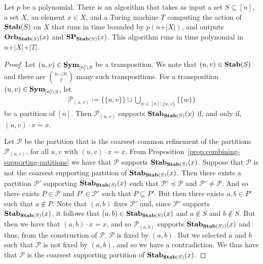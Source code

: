 \documentclass[../paper.tex]{subfiles}
\begin{document}
\begin{lem}
  \label{lem:computing-support-orbit}
  Let $p$ be a polynomial. There is an algorithm that takes as input a set $S
  \subseteq [n]$, a set $X$, an element $x \in X$, and a Turing machine $T$
  computing the action of $\text{\textbf{Stab}}(S)$ on $X$ that runs in time bounded by $p(n +
  \vert X \vert)$, and outputs $\text{\textbf{Orb}}_{\text{\textbf{Stab}}(S)} (x)$ and $\text{\textbf{SP}}_{\text{\textbf{Stab}}(S)}(x)$.
  This algorithm runs in time polynomial in $n + \vert X \vert + \vert T \vert$.
\end{lem}
\begin{proof}
  Let $(u, v) \in \text{\textbf{Sym}}_{[n] \setminus S}$ be a transposition. We note that
  $(u,v) \in \text{\textbf{Stab}}(S)$ and there are ${n - \vert S \vert}\choose{2}$ many such
  transpositions. For a transposition $(u, v) \in \text{\textbf{Sym}}_{[n] \setminus S}$, let
  \begin{align*}
    \mathcal{P}_{(u,v)} := \{ \{u,v\}\} \cup \bigcup_{w \in [n] \setminus \{ u,v \}} \{ \{ w \} \}
  \end{align*}
  be a partition of $[n]$. Then $\mathcal{P}_{(u,v)}$ supports
  $\text{\textbf{Stab}}_{\text{\textbf{Stab}}(S)}(x)$ if, and only if, $(u,v) \cdot x = x$.


  Let $\mathcal{P}$ be the partition that is the coarsest common refinement of
  the partitions $\mathcal{P}_{(u,v)}$, for all $u,v$ with $(u,v) \cdot x = x$.
  From Proposition~\ref{prop:combining-supporting-patitions} we have that
  $\mathcal{P}$ supports $\text{\textbf{Stab}}_{\text{\textbf{Stab}}(S)}(x)$. Suppose that $\mathcal{P}$ is
  not the coarsest supporting partition of $\text{\textbf{Stab}}_{\text{\textbf{Stab}}(S)}(x)$. Then there
  exists a partition $\mathcal{P}'$ supporting $\text{\textbf{Stab}}_{\text{\textbf{Stab}}(S)}(x)$ such that
  $\mathcal{P}' \preceq \mathcal{P}$ and $\mathcal{P}' \neq \mathcal{P}$. And so
  there exists $P \in \mathcal{P}$ and $P' \in \mathcal{P}'$ such that $P
  \subsetneq P'$. But then there exists $a , b \in P'$ such that $a \not\in P$.
  Note that $(a,b)$ fixes $\mathcal{P}'$ and, since $\mathcal{P}'$ supports
  $\text{\textbf{Stab}}_{\text{\textbf{Stab}}(S)}(x)$, it follows that $(a,b) \in \text{\textbf{Stab}}_{\text{\textbf{Stab}}(S)}(x)$ and $a
  \not\in S$ and $b \not\in S$. But then we have that $(a,b) \cdot x = x$, and
  so $\mathcal{P}_{(a,b)}$ supports $\text{\textbf{Stab}}_{\text{\textbf{Stab}}(S))}(x)$ and thus, from the
  construction of $\mathcal{P}$, $\mathcal{P}$ is fixed by $(a,b)$. But we
  selected $a$ and $b$ such that $\mathcal{P}$ is not fixed by $(a,b)$, and so
  we have a contradiction. We thus have that $\mathcal{P}$ is the coarsest
  supporting partition of $\text{\textbf{Stab}}_{\text{\textbf{Stab}}(S)}(x)$.


\end{proof}
\end{document}
